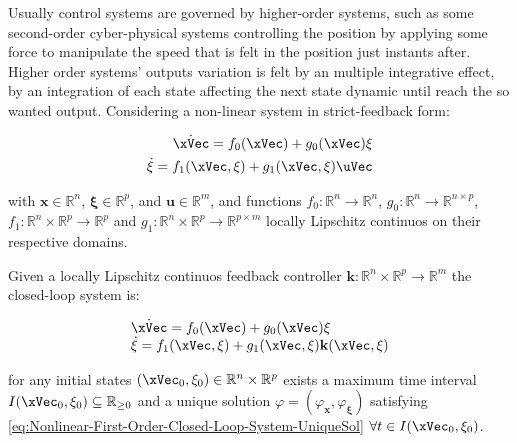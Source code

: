Usually control systems are governed by higher-order systems, such as some second-order cyber-physical systems controlling the position by applying some force to manipulate the speed that is felt in the position just instants after.  Higher order systems' outputs variation is felt by an multiple integrative effect, by an integration of each state affecting the next state dynamic until reach the so wanted output. Considering a non-linear system in strict-feedback form:

\begin{subequations}
    
    \label{eq:HH-NL-System}
    \begin{align}
        \dot{\xVec} = f_0(\xVec) + g_0(\xVec) \mathbf{\xi} 
        \label{eq:HH-NL-System-1stOrder}\\
        \dot{ \mathbf{\xi} } =  f_1(\xVec, \mathbf{\xi}) + g_1(\xVec, \mathbf{\xi}) \uVec
        \label{eq:HH-NL-System-2ndOrder}
    \end{align}
\end{subequations}

with \(\mathbf{x} \in \mathbb{R}^n \), \(\mathbf{\xi} \in \mathbb{R}^p \), and \(\mathbf{u} \in \mathbb{R}^m \), and functions \(f_0: \mathbb{R}^n \to \mathbb{R}^n \), \(g_0: \mathbb{R}^n \to \mathbb{R}^{n \times p} \), \(f_1: \mathbb{R}^n \times \mathbb{R}^p \to \mathbb{R}^p \) and \(g_1: \mathbb{R}^n \times \mathbb{R}^p \to \mathbb{R}^{ p \times m} \) locally Lipschitz continuos on their respective domains. \par
Given a locally Lipschitz continuos feedback controller \(\mathbf{k}: \mathbb{R}^n \times \mathbb{R}^p \to \mathbb{R}^m  \) the closed-loop system is:

\begin{equation}
    \begin{array}{l}
        \dot{\xVec} = f_0(\xVec) + g_0(\xVec) \mathbf{\xi}\\ 
        \dot{ \mathbf{\xi} } =  f_1(\xVec, \mathbf{\xi}) + g_1(\xVec, \mathbf{\xi}) \mathbf{k}(\xVec, \mathbf{\xi})
    \end{array}
 \label{eq:HH-NL-CL-System}
\end{equation}

for any initial states \((\xVec_0, \mathbf{\xi}_0) \in \mathbb{R}^n \times \mathbb{R}^p\) exists a maximum time interval \(I(\xVec_0, \mathbf{\xi}_0) \subseteq \mathbb{R}_{\geq 0}  \) and a unique solution \( \varphi = (\varphi_{\mathbf{x}}, \varphi_{\mathbf{\xi}}) \) satisfying \ref{eq:Nonlinear-First-Order-Closed-Loop-System-UniqueSol} \(\forall t \in I(\xVec_0, \mathbf{\xi}_0) \). \\


